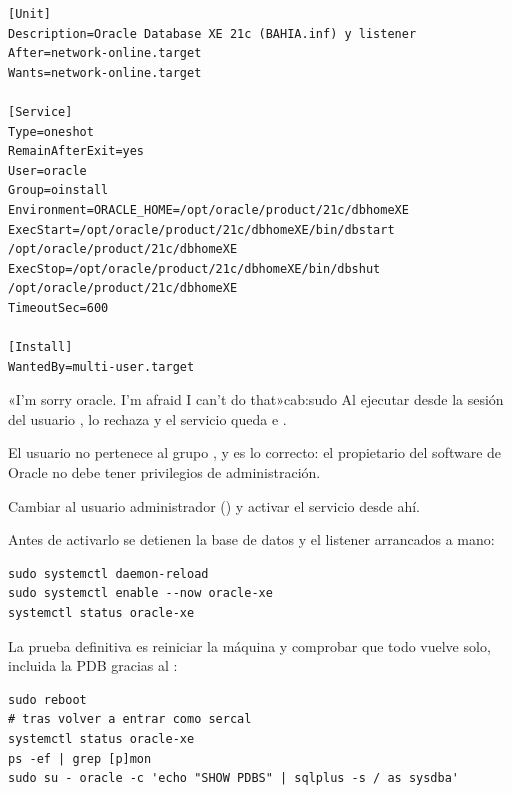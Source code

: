 \begin{lstlisting}[style=fichero,caption={\texttt{/etc/systemd/system/oracle-xe.service}}]
[Unit]
Description=Oracle Database XE 21c (BAHIA.inf) y listener
After=network-online.target
Wants=network-online.target

[Service]
Type=oneshot
RemainAfterExit=yes
User=oracle
Group=oinstall
Environment=ORACLE_HOME=/opt/oracle/product/21c/dbhomeXE
ExecStart=/opt/oracle/product/21c/dbhomeXE/bin/dbstart /opt/oracle/product/21c/dbhomeXE
ExecStop=/opt/oracle/product/21c/dbhomeXE/bin/dbshut /opt/oracle/product/21c/dbhomeXE
TimeoutSec=600

[Install]
WantedBy=multi-user.target
\end{lstlisting}


\begin{cabezazo}{«I'm sorry oracle. I'm afraid I can't do that»}{cab:sudo}
\problema Al ejecutar  desde la sesión del usuario
,  lo rechaza y el servicio queda  e
.

\causa El usuario  no pertenece al grupo , y es lo
correcto: el propietario del software de Oracle no debe tener privilegios de
administración.

\solucion Cambiar al usuario administrador () y activar el
servicio desde ahí.
\end{cabezazo}

Antes de activarlo se detienen la base de datos y el listener arrancados a mano:


\begin{lstlisting}[style=bash]
sudo systemctl daemon-reload
sudo systemctl enable --now oracle-xe
systemctl status oracle-xe
\end{lstlisting}


La prueba definitiva es reiniciar la máquina y comprobar que todo vuelve solo,
incluida la PDB gracias al :

\begin{lstlisting}[style=bash]
sudo reboot
# tras volver a entrar como sercal
systemctl status oracle-xe
ps -ef | grep [p]mon
sudo su - oracle -c 'echo "SHOW PDBS" | sqlplus -s / as sysdba'
\end{lstlisting}

